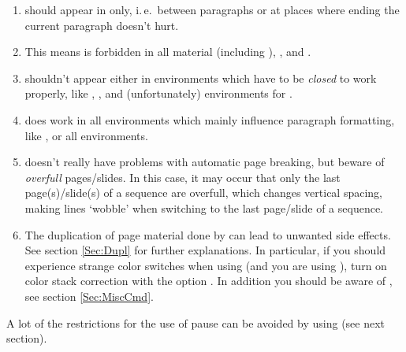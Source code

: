\documentclass[12pt]{scrartcl}
\let\newslide=\relax
\begin{document}
  \newslide

  \begin{enumerate}
  \item {} should appear in  only, i.\,e.\ between paragraphs or at places where
    ending the current paragraph doesn't hurt.

  \item This means  is forbidden in all  material (including ),
    , and .

  \item {} shouldn't appear either in environments which have to be \emph{closed} to work properly, like
    , , and (unfortunately) environments for .

  \item {} does work in all environments which mainly influence paragraph formatting, like ,
     or all  environments.

    \newslide

  \item {} doesn't really have problems with automatic page breaking, but beware of \emph{overfull}
    pages/slides. In this case, it may occur that only the last page(s)/slide(s) of a sequence are overfull, which
    changes vertical spacing, making lines `wobble' when switching to the last page/slide of a sequence.

    \newslide

  \item The duplication of page material done by  can lead to unwanted side effects. See section
    \ref{Sec:Dupl} for further explanations. In particular, if you should experience strange color switches when using
     (and you are  using ), turn on color stack correction with the option
    . In addition you should be aware of , see section
    \ref{Sec:MiscCmd}.

  \end{enumerate}

  A lot of the restrictions for the use of pause can be avoided by using  (see next section).

  \newslide

\end{document}
